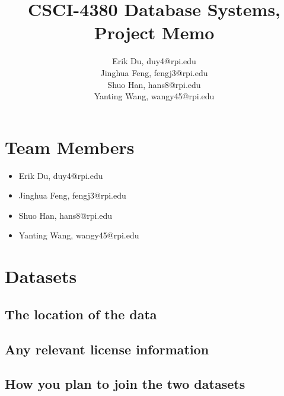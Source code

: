 \documentclass{article}
\title{CSCI-4380 Database Systems, Project Memo}
\author{Erik Du, duy4@rpi.edu\\
	Jinghua Feng, fengj3@rpi.edu\\
	Shuo Han, hans8@rpi.edu\\
	Yanting Wang, wangy45@rpi.edu}
\begin{document}
\maketitle
\section{Team Members}
\begin{itemize}
	\item Erik Du, duy4@rpi.edu
	\item Jinghua Feng, fengj3@rpi.edu
	\item Shuo Han, hans8@rpi.edu
	\item Yanting Wang, wangy45@rpi.edu
\end{itemize}
\section{Datasets}
\subsection{The location of the data}
\subsection{ Any relevant license information}
\subsection{ How you plan to join the two datasets }
\end{document}

